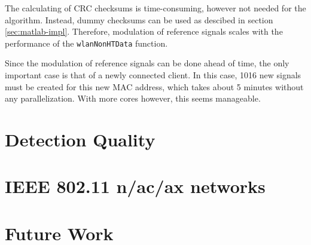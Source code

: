 The calculating of CRC checksums is time-consuming, however not needed for the algorithm. Instead, dummy checksums can be used as descibed in section \ref{sec:matlab-impl}. Therefore, modulation of reference signals scales with the performance of the \texttt{wlanNonHTData} function.

Since the modulation of reference signals can be done ahead of time, the only important case is that of a newly connected client. In this case, 1016 new signals must be created for this new MAC address, which takes about 5 minutes without any parallelization. With more cores however, this seems manageable.



\section{Detection Quality}\label{sec:detection-quality}



\section{IEEE 802.11 n/ac/ax networks}



\section{Future Work}
